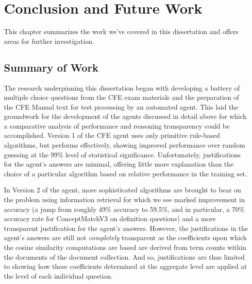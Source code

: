  

\chapter{Conclusion and Future Work}

This chapter summarizes the work we’ve covered in this dissertation and offers areas for further investigation.

\section{Summary of Work}

The research underpinning this dissertation began with developing a battery of multiple choice questions from the CFE exam materials and the preparation of the CFE Manual text for test processing by an automated agent. This laid the groundwork for the development of the agents discussed in detail above for which a comparative analysis of performance and reasoning transparency could be accomplished.  Version 1 of the CFE agent uses only primitive rule-based algorithms, but performs effectively, showing improved performance over random guessing at the 99\% level of statistical significance.  Unfortunately, justifications for the agent’s answers are minimal, offering little more explanation than the choice of a particular algorithm based on relative performance in the training set.  

In Version 2 of the agent, more sophisticated algorithms are brought to bear on the problem using information retrieval for which we see marked improvement in accuracy (a jump from roughly 49\% accuracy to 59.5\%, and in particular, a 70\% accuracy rate for ConceptMatchV3 on definition questions) and a more transparent justification for the agent’s answers. However, the justifications in the agent's answers are still not \emph{completely} transparent as the coefficients upon which the cosine similarity computations are based are derived from term counts within the documents of the document collection. And so, justifications are thus limited to showing how these coefficients determined at the aggregate level are applied at the level of each individual question.

